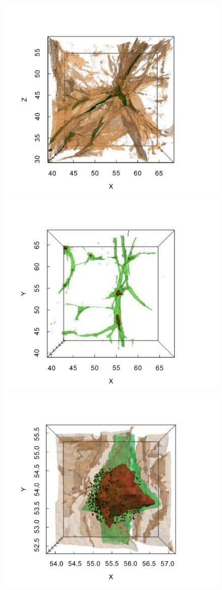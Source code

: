 \begin{figure}
\centering
\begin{minipage}[c]{.45\linewidth}
\includegraphics[width=9.cm]{Chapter3/Source_v2/fig5a} 
\end{minipage}
\begin{minipage}[c]{0.45\linewidth}
\includegraphics[width=9.cm]{Chapter3/Source_v2/fig5b} 
\end{minipage} 
\begin{minipage}[c]{0.45\linewidth}
\includegraphics[width=9.cm]{Chapter3/Source_v2/fig5c} 

\end{minipage}
\end{figure}
